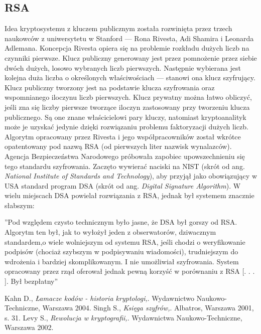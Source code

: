 \documentclass[10pt, letterpaper, titlepage]{article}
\begin{document}
\subsection{RSA}
Idea kryptosystemu z kluczem publicznym została rozwinięta przez trzech naukowców z uniwersytetu w Stanford — Rona Rivesta, Adi Shamira i Leonarda Adlemana. Koncepcja Rivesta opiera
się na problemie rozkładu dużych liczb na czynniki pierwsze. Klucz publiczny generowany jest
przez pomnożenie przez siebie dwóch dużych, losowo wybranych liczb pierwszych. Następnie wybierana jest kolejna duża liczba o określonych właściwościach — stanowi ona klucz szyfrujący.
Klucz publiczny tworzony jest na podstawie klucza szyfrowania oraz wspomnianego iloczynu liczb
pierwszych. Klucz prywatny można łatwo obliczyć, jeśli zna się liczby pierwsze tworzące iloczyn
zastosowany przy tworzeniu klucza publicznego. Są one znane właścicielowi pary kluczy, natomiast
kryptoanalityk może je uzyskać jedynie dzięki rozwiązaniu problemu faktoryzacji dużych liczb.
Algorytm opracowany przez Rivesta i jego współpracowników został wkrótce opatentowany pod
nazwą RSA (od pierwszych liter nazwisk wynalazców). Agencja Bezpieczeństwa Narodowego próbowała zapobiec upowszechnieniu się tego standardu szyfrowania. Zaczęto wywierać naciski na
NIST (skrót od ang. \textit{National Institute of Standards and Technology}), aby przyjął jako obowiązujący w USA standard program DSA (skrót od ang. \textit{Digital Signature Algorithm}).
W wielu miejscach DSA powielał rozwiązania z RSA, jednak był systemem znacznie słabszym:
\begin{center}
”Pod względem czysto technicznym było jasne, że DSA był gorszy od RSA. Algorytm ten był,
jak to wyłożył jeden z obserwatorów, dziwacznym standardem,o wiele wolniejszym od systemu
RSA, jeśli chodzi o weryfikowanie podpisów (chociaż szybszym w podpisywaniu wiadomości),
trudniejszym do wdrożenia i bardziej skomplikowanym. I nie umożliwiał szyfrowania. System
opracowany przez rząd oferował jednak pewną korzyść w porównaniu z RSA [. . . ]. Był
bezpłatny”\cite{texlist}
\end{center}
\begin{thebibliography}{9}
  Kahn D.,
 \textit{Łamacze kodów - historia kryptologi,}.
 Wydawnictwo Naukowo-Techniczne, Warszawa 2004.
  Singh S.,
 \textit{ Księga szyfrów,}.
 Albatros, Warszawa 2001, s. 31.
 Levy S.,
 \textit{Rewolucja w kryptografii,}.
 Wydawnictwa Naukowo-Techniczne, Warszawa 2002.
\end{thebibliography}
\end{document}
